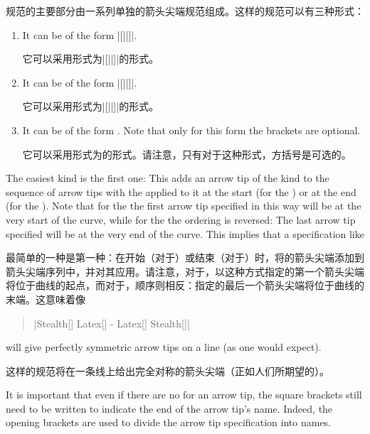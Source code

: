 规范的主要部分由一系列单独的箭头尖端规范组成。这样的规范可以有三种形式：
%
\begin{enumerate}
    \item It can be of the form |[||]|.

        它可以采用形式为|[||]|的形式。
    \item It can be of the form |[||]|.

    它可以采用形式为|[||]|的形式。
    \item It can be of the form . Note that only for this form
        the brackets are optional.

        它可以采用形式为的形式。请注意，只有对于这种形式，方括号是可选的。
\end{enumerate}

The easiest kind is the first one: This adds an arrow tip of the kind
 to the sequence of arrow tips with the
 applied to it at the start (for the )
or at the end (for the ). Note that for the  the first arrow tip specified in this way will be at the very
start of the curve, while for the  the ordering is
reversed: The last arrow tip specified will be at the very end of the curve.
This implies that a specification like

最简单的一种是第一种：在开始（对于）或结束（对于）时，将的箭头尖端添加到箭头尖端序列中，并对其应用。请注意，对于，以这种方式指定的第一个箭头尖端将位于曲线的起点，而对于，顺序则相反：指定的最后一个箭头尖端将位于曲线的末端。这意味着像

\begin{quote}
    |Stealth[] Latex[] - Latex[] Stealth[]|
\end{quote}
%
will give perfectly symmetric arrow tips on a line (as one would expect).

这样的规范将在一条线上给出完全对称的箭头尖端（正如人们所期望的）。

It is important that even if there are no  for an arrow tip, the
square brackets still need to be written to indicate the end of the arrow tip's
name. Indeed, the opening brackets are used to divide the arrow tip
specification into names.

